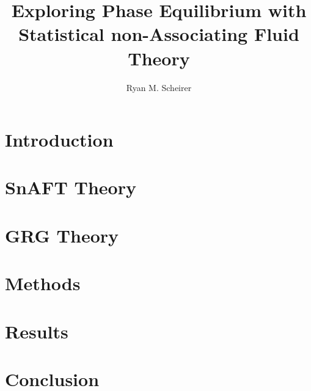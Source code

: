 \documentclass[12pt,twoside]{report}
\title{Exploring Phase Equilibrium with Statistical non-Associating Fluid Theory}
\author{Ryan M. Scheirer}
\begin{document}






\tableofcontents

\listoffigures

\chapter{Introduction}


\chapter{SnAFT Theory}


\chapter{GRG Theory}


\chapter{Methods}


\chapter{Results}


\chapter{Conclusion}



\printbibliography
\end{document}
